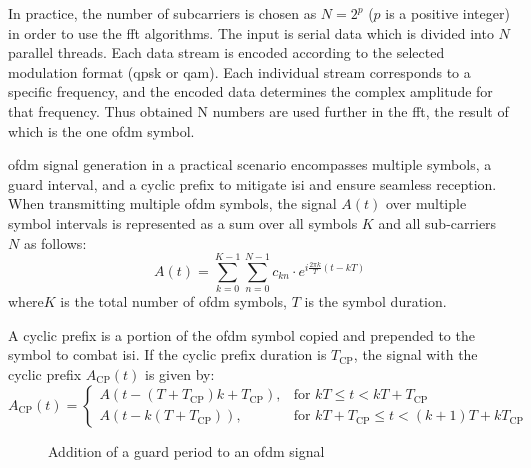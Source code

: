 In practice, the number of subcarriers is chosen as $N = 2^p$ ($p$ is a positive integer) in order to use the \gls{fft} algorithms. 
The input is serial data which is divided into $N$ parallel threads. Each data stream is encoded according to the selected modulation format (\acrshort{qpsk} or \acrshort{qam}). Each individual stream corresponds to a specific frequency, and the encoded data determines the complex amplitude for that frequency. Thus obtained N numbers are used further in the \Gls{fft}, the result of which is the one \acrshort{ofdm} symbol. 


\acrfull{ofdm} signal generation in a practical scenario encompasses multiple symbols, a guard interval, and a cyclic prefix to mitigate \acrfull{isi} and ensure seamless reception. 
When transmitting multiple \acrshort{ofdm} symbols, the signal \( A(t) \) over multiple symbol intervals is represented as a sum over all symbols \( K \) and all sub-carriers \( N \) as follows:
\begin{equation}
A(t) = \sum_{k=0}^{K-1} \sum_{n=0}^{N-1} c_{kn} \cdot e^{i \frac{2 \pi k}{T} (t - kT)}
\label{eq:ofdm_signal}
\end{equation}
where\( K \) is the total number of \acrshort{ofdm} symbols, \( T \) is the symbol duration.

A cyclic prefix is a portion of the \acrshort{ofdm} symbol copied and prepended to the symbol to combat \acrshort{isi}. If the cyclic prefix duration is \( T_{\text{CP}} \), the signal with the cyclic prefix \( A_{\text{CP}}(t) \) is given by:
\begin{equation}
A_{\text{CP}}(t) = 
\begin{cases} 
A(t - (T + T_{\text{CP}})k + T_{\text{CP}}), & \text{for } kT \leq t < kT + T_{\text{CP}} \\
A(t - k(T + T_{\text{CP}})), & \text{for } kT + T_{\text{CP}} \leq t < (k+1)T + kT_{\text{CP}}
\end{cases}
\end{equation}

\begin{figure}[htpb]
    \caption{Addition of a guard period to an \acrshort{ofdm} signal}
    \label{fig:ofdm_signal}
\end{figure}

